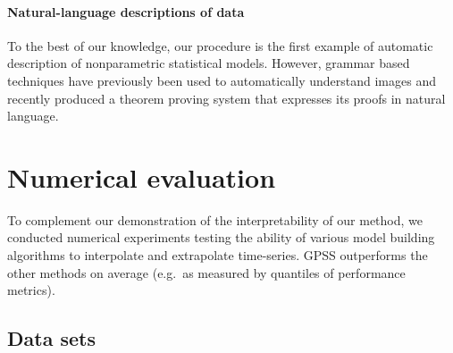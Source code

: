 \documentclass{article}
\def\eg{e.g.\ }
\begin{document}


\paragraph{Natural-language descriptions of data}

To the best of our knowledge, our procedure is the first example of automatic description of nonparametric statistical models.%
However, grammar based techniques have previously been used to automatically understand images \cite{zhu2007stochastic} and recently \citet{GanesalingamG13} produced a theorem proving system that expresses its proofs in natural language.








\section{Numerical evaluation}
\label{sec:numerical}

To complement our demonstration of the interpretability of our method, we conducted numerical experiments testing the ability of various model building algorithms to interpolate and extrapolate time-series.
GPSS outperforms the other methods on average (\eg as measured by quantiles of performance metrics).

\subsection{Data sets}
\end{document}
